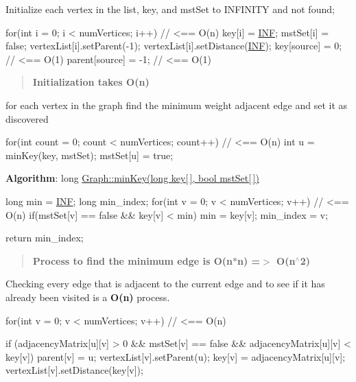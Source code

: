 Initialize each vertex in the list, key, and mst\+Set to I\+N\+F\+I\+N\+I\+TY and not found;


\begin{DoxyCode}
\textcolor{keywordflow}{for}(\textcolor{keywordtype}{int} i = 0; i < numVertices; i++)        \textcolor{comment}{// <== O(n)}
    key[i] = \hyperlink{vertex_8h_a12c2040f25d8e3a7b9e1c2024c618cb6}{INF};
    mstSet[i] = \textcolor{keyword}{false};
    vertexList[i].setParent(-1);
    vertexList[i].setDistance(\hyperlink{vertex_8h_a12c2040f25d8e3a7b9e1c2024c618cb6}{INF});
key[source] = 0;                            \textcolor{comment}{// <== O(1)}
parent[source] = -1;                        \textcolor{comment}{// <== O(1)}
\end{DoxyCode}


\begin{quote}
{\bfseries Initialization takes O(n)} \end{quote}


for each vertex in the graph find the minimum weight adjacent edge and set it as discovered 
\begin{DoxyCode}
\textcolor{keywordflow}{for}(\textcolor{keywordtype}{int} count = 0; count < numVertices; count++) \textcolor{comment}{// <== O(n)}
    \textcolor{keywordtype}{int} u = minKey(key, mstSet);
    mstSet[u] = \textcolor{keyword}{true};
\end{DoxyCode}


{\bfseries Algorithm}\+: long \hyperlink{class_graph_a6ce87b850b22cc6deed2b58f3760c4a9}{Graph\+::min\+Key(long key\mbox{[}$\,$\mbox{]}, bool mst\+Set\mbox{[}$\,$\mbox{]})} 
\begin{DoxyCode}
\textcolor{keywordtype}{long} min = \hyperlink{vertex_8h_a12c2040f25d8e3a7b9e1c2024c618cb6}{INF};
\textcolor{keywordtype}{long} min\_index;
\textcolor{keywordflow}{for}(\textcolor{keywordtype}{int} v = 0; v < numVertices; v++)            \textcolor{comment}{// <== O(n)}
    \textcolor{keywordflow}{if}(mstSet[v] == \textcolor{keyword}{false} && key[v] < min)
        min = key[v];
        min\_index = v;

\textcolor{keywordflow}{return} min\_index;
\end{DoxyCode}


\begin{quote}
{\bfseries Process to find the minimum edge is O(n$\ast$n) =$>$ O(n$^\wedge$2)} \end{quote}


Checking every edge that is adjacent to the current edge and to see if it has already been visited is a {\bfseries O(n)} process. 
\begin{DoxyCode}
\textcolor{keywordflow}{for}(\textcolor{keywordtype}{int} v = 0; v < numVertices; v++)         \textcolor{comment}{// <== O(n)}

    \textcolor{keywordflow}{if} (adjacencyMatrix[u][v] > 0 && mstSet[v] == \textcolor{keyword}{false} && adjacencyMatrix[u][v] < key[v])
        parent[v] = u;
        vertexList[v].setParent(u);
        key[v] = adjacencyMatrix[u][v];
        vertexList[v].setDistance(key[v]);
\end{DoxyCode}


